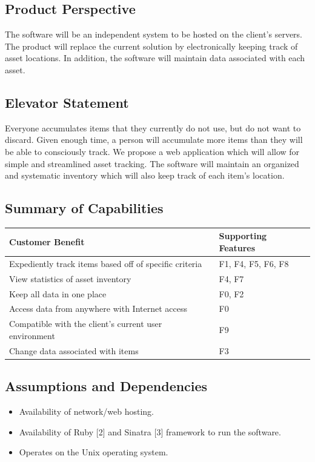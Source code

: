 \documentclass{article}
\begin{document}
\subsection{Product Perspective}
The software will be an independent system to be hosted on the client's servers.  The product will replace the current solution by electronically keeping track of asset locations. In addition, the software will maintain data associated with each asset.

\subsection{Elevator Statement}
Everyone accumulates items that they currently do not use, but do not want to discard.  Given enough time, a person will accumulate more items than they will be able to consciously track. We propose a web application which will allow for simple and streamlined asset tracking. The software will maintain an organized and systematic inventory which will also keep track of each item's location.

\subsection{Summary of Capabilities}
\begin{tabular}{ | p{4.0in} | p{2.0in} | }
\hline
\textbf{Customer Benefit} & \textbf{Supporting Features}\\
\hline
\hline
Expediently track items based off of specific criteria & F1, F4, F5, F6, F8\\
\hline
View statistics of asset inventory & F4, F7\\
\hline
Keep all data in one place & F0, F2\\
\hline
Access data from anywhere with Internet access & F0\\
\hline
Compatible with the client's current user environment & F9\\
\hline
Change data associated with items & F3\\
\hline
\end{tabular}
\clearpage
\subsection{Assumptions and Dependencies}
\begin{itemize}
\item Availability of network/web hosting.
\item Availability of Ruby [2] and Sinatra [3] framework to run the software.
\item Operates on the Unix operating system.
\end{itemize}
\end{document}
